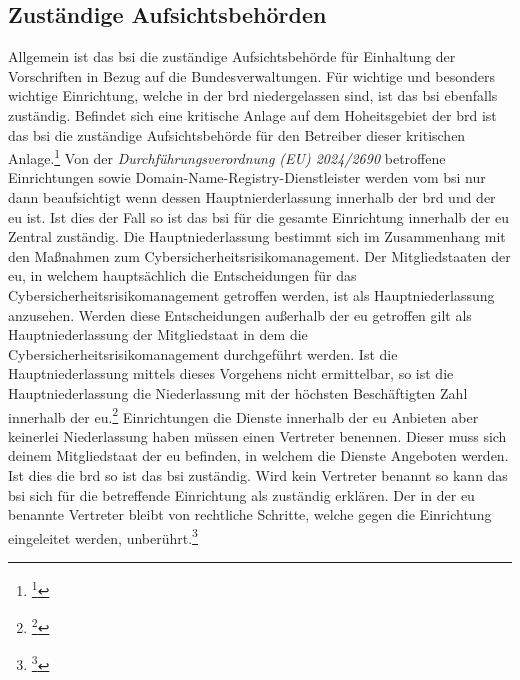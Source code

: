 \documentclass[11pt,a4paper,hidelinks]{article}   %
\begin{document}
        \subsection{Zuständige Aufsichtsbehörden}
        Allgemein ist das \gls{bsi} die zuständige Aufsichtsbehörde für Einhaltung der Vorschriften in Bezug auf die Bundesverwaltungen. Für wichtige und besonders wichtige Einrichtung, welche in der \gls{brd} niedergelassen sind, ist das \gls{bsi} ebenfalls zuständig. Befindet sich eine kritische Anlage auf dem Hoheitsgebiet der \gls{brd} ist das \gls{bsi} die zuständige Aufsichtsbehörde für den Betreiber dieser kritischen Anlage.\footnote{
            \footcite[Vgl. §59,][]{NIS2UmsuCG}
        }\medbreak
        Von der \emph{Durchführungsverordnung (EU) 2024/2690} betroffene Einrichtungen sowie Domain-Name-Registry-Dienstleister werden vom \gls{bsi} nur dann beaufsichtigt wenn dessen Hauptnierderlassung innerhalb der \gls{brd} und der \gls{eu} ist. Ist dies der Fall so ist das \gls{bsi} für die gesamte Einrichtung innerhalb der \gls{eu} Zentral zuständig. Die Hauptniederlassung bestimmt sich im Zusammenhang mit den Maßnahmen zum Cybersicherheitsrisikomanagement. Der Mitgliedstaaten der \gls{eu}, in welchem hauptsächlich die Entscheidungen für das Cybersicherheitsrisikomanagement getroffen werden, ist als Hauptniederlassung anzusehen. Werden diese Entscheidungen außerhalb der \gls{eu} getroffen gilt als Hauptniederlassung der Mitgliedstaat in dem die Cybersicherheitsrisikomanagement durchgeführt werden. Ist die Hauptniederlassung mittels dieses Vorgehens nicht ermittelbar, so ist die Hauptniederlassung die Niederlassung mit der höchsten Beschäftigten Zahl innerhalb der \gls{eu}.\footnote{
            \footcite[Vgl. §60, Absatz 1 \& 2 ][]{NIS2UmsuCG}
        }
        Einrichtungen die Dienste innerhalb der \gls{eu} Anbieten aber keinerlei Niederlassung haben müssen einen Vertreter benennen. Dieser muss sich deinem Mitgliedstaat der \gls{eu} befinden, in welchem die Dienste Angeboten werden. Ist dies die \gls{brd} so ist das \gls{bsi} zuständig. Wird kein Vertreter benannt so kann das \gls{bsi} sich für die betreffende Einrichtung als zuständig erklären. Der in der \gls{eu} benannte Vertreter bleibt von rechtliche Schritte, welche gegen die Einrichtung eingeleitet werden, unberührt.\footnote{
            \footcite[Vgl. §60, Absatz 3 \& 4 ][]{NIS2UmsuCG}
        }\medbreak
\end{document}
